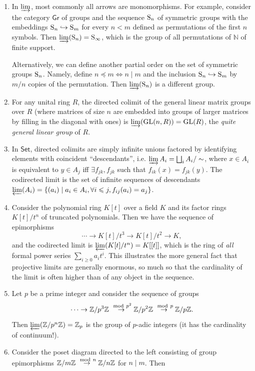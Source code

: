 \begin{example}
\begin{enumerate}
    \item In $\varinjlim$, most commonly all arrows are monomorphisms. For example, consider the category $\mathsf{Gr}$ of groups and the sequence $\mathrm{S}_n$ of symmetric groups with the embeddings $\mathrm{S}_n\hookrightarrow \mathrm{S}_m$ for every $n<m$ defined as permutations of the first $n$ symbols. Then $\varinjlim(\mathrm{S}_n)=\mathrm{S}_\infty$, which is the group of all permutations of $\mathbb{N}$ of finite support.
    
    Alternatively, we can define another partial order on the set of symmetric groups $\mathrm{S}_n$. Namely, define $n\preccurlyeq m\Leftrightarrow n\mid m$ and the inclusion $\mathrm{S}_n\hookrightarrow \mathrm{S}_m$ by $m/n$ copies of the permutation. Then $\varinjlim (\mathrm{S}_n)$ is a different group.
    \item For any unital ring $R$, the directed colimit of the general linear matrix groups over $R$ (where matrices of size $n$ are embedded into groups of larger matrices by filling in the diagonal with ones) is $\varinjlim(\operatorname{GL}(n,R))=\operatorname{GL}(R)$, the \emph{quite general linear group} of $R$.
    \item In $\mathsf{Set}$, directed colimits are simply infinite unions factored by identifying elements with coincident ``descendants'', i.e. $\varinjlim A_i=\bigsqcup_i A_i/\sim$, where $x\in A_i$ is equivalent to $y\in A_j$ iff $\exists f_{jk},f_{jk}$ such that $f_{ik}(x)=f_{jk}(y)$. The codirected limit is the set of infinite sequences of descendants $\varprojlim (A_i)=\{(a_i)\mid a_i\in A_i,\forall i\leqslant j, f_{ij}(a_i)=a_j\}$.
    \item Consider the polynomial ring $K[t]$ over a field $K$ and its factor rings $K[t]/t^n$ of truncated polynomials. Then we have the sequence of epimorphisms 
    \[\cdots \to K[t]/t^3\to K[t]/t^2\to K,\]
    and the codirected limit is $\varprojlim(K[t]/t^n)=K[[t]]$, which is the ring of \emph{all} formal power series $\sum_{i\geq 0}a_i t^i$. This illustrates the more general fact that projective limits are generally enormous, so much so that the cardinality of the limit is often higher than of any object in the sequence.
    \item Let $p$ be a prime integer and consider the sequence of groups
    \[\cdots\to \mathbb{Z}/p^3 \mathbb{Z}\overset{\ \mathrm{mod}\  p^2}\to \mathbb{Z}/p^2\mathbb{Z}\overset{\ \mathrm{mod}\  p}\to \mathbb{Z}/p\mathbb{Z}.\]
    Then $\varprojlim(\mathbb{Z}/p^n\mathbb{Z})=\mathbb{Z}_p$ is the group of $p$-adic integers (it has the cardinality of continuum!).
    \item Consider the poset diagram directed to the left consisting of group epimorphisms $\mathbb{Z}/m\mathbb{Z}\overset{\ \mathrm{mod}\  n}\to \mathbb{Z}/n\mathbb{Z}$ for $n\mid m$. Then 

\end{enumerate}
\end{example}
